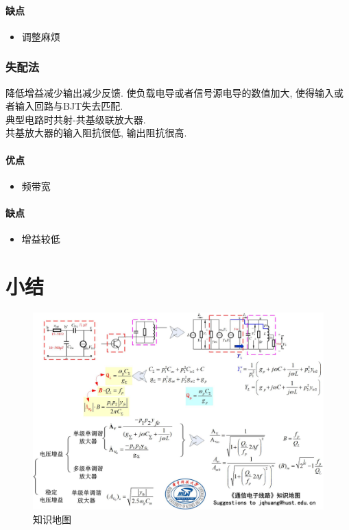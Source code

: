 \documentclass[a4paper]{report}
\begin{document}
\paragraph{缺点}
\begin{itemize}
  \item 调整麻烦
\end{itemize}
\subsubsection{失配法}
降低增益减少输出减少反馈. 使负载电导或者信号源电导的数值加大, 使得输入或者输入回路与BJT失去匹配. \\
典型电路时共射-共基级联放大器. \\
共基放大器的输入阻抗很低, 输出阻抗很高. 
\paragraph{优点}
\begin{itemize}
  \item 频带宽
\end{itemize}
\paragraph{缺点}
\begin{itemize}
  \item 增益较低
\end{itemize}
\section{小结}
\begin{figure}
\centering
\includegraphics[width=1\textwidth]{small_amp_map.jpg}
\caption{知识地图}
\end{figure}
\end{document}
